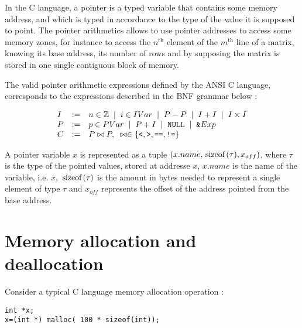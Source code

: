 \documentclass[a4paper,twoside,12pt]{report}
\newcommand{\NULL}[0]{\mbox{\texttt{NULL}}}
\newcommand{\ptroffset}[1]{{#1}_{off}}
\newcommand{\nth}[1]{$#1^{\mbox{th}}$}
\newcommand{\sizeof}[1]{\mbox{\lstinline!sizeof!}(#1)}
\begin{document}
\label{sec:pointermodel}

In the C language, a pointer is a typed variable that contains some memory address, and which is typed in accordance to the type of the value it is supposed
to point.
The pointer arithmetics allows to use pointer addresses to access some
memory zones, for instance to access the \nth{n} element of the \nth{m}
line of a matrix, knowing its base address, its number of rows and by
supposing the matrix is stored in one single contiguous block of memory.

The valid pointer arithmetic expressions defined by the ANSI C language, corresponds to the expressions described in the BNF grammar below :

$$
\begin{array}{lll}

I &:=& n \in \mathbb{Z} \gspace | \gspace i\in IVar \gspace | \gspace P - P \gspace | \gspace I + I \gspace | \gspace I \times I \\
P &:=& p\in PVar \gspace | \gspace P + I \gspace | \gspace  \NULL \gspace| \gspace \texttt{\&} Exp\\
C&:=& P \bowtie P, \gspace \bowtie \in \lbrace \texttt{<},\texttt{>},\texttt{==},\texttt{!=}\rbrace
\end{array}
$$
 
A pointer variable $x$ is represented as a tuple
$(x.name,\sizeof{\tau},\ptroffset{x})$, where $\tau$ is the type of the pointed values, stored at addresse $x$, $x.name$ is the name of the variable, i.e. $x$, $\sizeof{\tau}$ is the amount in bytes needed to represent a single element of type $\tau$ and $\ptroffset{x}$ represents the offset of the address pointed from the base address.



\section{Memory allocation and deallocation}
\label{sec:memalloc}
Consider a typical C language memory allocation operation :

\lstset{
language=C
}

\begin{lstlisting}
int *x;
x=(int *) malloc( 100 * sizeof(int));
\end{lstlisting}
\end{document}
